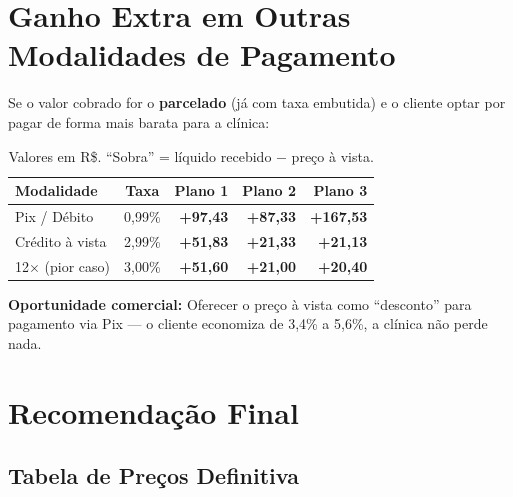 \documentclass[12pt, a4paper]{article}
\begin{document}
\needspace{10cm}

\section{Ganho Extra em Outras Modalidades de Pagamento}

Se o valor cobrado for o \textbf{parcelado} (já com taxa embutida) e o cliente optar por pagar de forma mais barata para a clínica:

\begin{table}[H]
    \centering
    \footnotesize
    \renewcommand{\arraystretch}{1.4}
    \begin{tabularx}{\textwidth}{X c r r r}
        \toprule
        \rowcolor{tableHeader} \textbf{Modalidade} & \textbf{Taxa} & \textbf{Plano 1} & \textbf{Plano 2} & \textbf{Plano 3} \\
        \midrule
        Pix / Débito & 0,99\% & \textcolor{successGreen}{\textbf{+97,43}} & \textcolor{successGreen}{\textbf{+87,33}} & \textcolor{successGreen}{\textbf{+167,53}} \\
        \rowcolor{lightGray}
        Crédito à vista & 2,99\% & \textcolor{successGreen}{\textbf{+51,83}} & \textcolor{successGreen}{\textbf{+21,33}} & \textcolor{successGreen}{\textbf{+21,13}} \\
        12$\times$ (pior caso) & 3,00\% & \textcolor{successGreen}{\textbf{+51,60}} & \textcolor{successGreen}{\textbf{+21,00}} & \textcolor{successGreen}{\textbf{+20,40}} \\
        \bottomrule
    \end{tabularx}
    \caption*{\footnotesize Valores em R\$. ``Sobra'' = líquido recebido $-$ preço à vista.}
\end{table}

\textcolor{primaryColor}{\textbf{Oportunidade comercial:}} Oferecer o preço à vista como ``desconto'' para pagamento via Pix — o cliente economiza de 3,4\% a 5,6\%, a clínica não perde nada.

\needspace{10cm}

\pagebreak

\section{Recomendação Final}

\subsection{Tabela de Preços Definitiva}
\end{document}
